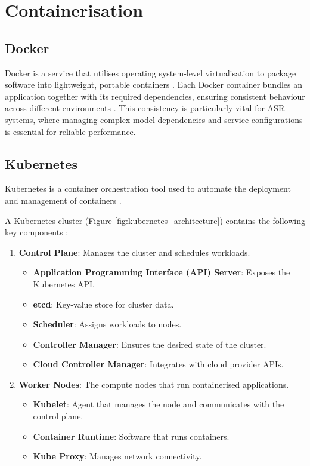 \section{Containerisation}
\subsection{Docker}
Docker is a service that utilises operating system-level virtualisation to package software into lightweight, portable containers \cite{docker_definition}. Each Docker container bundles an application together with its required dependencies, ensuring consistent behaviour across different environments \cite{container_definition}. This consistency is particularly vital for ASR systems, where managing complex model dependencies and service configurations is essential for reliable performance.
\subsection{Kubernetes}
Kubernetes is a container orchestration tool used to automate the deployment and management of containers \cite{k8s_definition}. 

A Kubernetes cluster (Figure \ref{fig:kubernetes_architecture}) contains the following key components \cite{k8s_cluster}:
\begin{enumerate}
    \item \textbf{Control Plane}: Manages the cluster and schedules workloads.
    \begin{itemize}
        \item \textbf{Application Programming Interface (API) Server}: Exposes the Kubernetes API.
        \item \textbf{etcd}: Key-value store for cluster data.
        \item \textbf{Scheduler}: Assigns workloads to nodes.
        \item \textbf{Controller Manager}: Ensures the desired state of the cluster.
        \item \textbf{Cloud Controller Manager}: Integrates with cloud provider APIs.
    \end{itemize}
    \item \textbf{Worker Nodes}: The compute nodes that run containerised applications.
    \begin{itemize}
        \item \textbf{Kubelet}: Agent that manages the node and communicates with the control plane.
        \item \textbf{Container Runtime}: Software that runs containers.
        \item \textbf{Kube Proxy}: Manages network connectivity.
    \end{itemize}
\end{enumerate}

